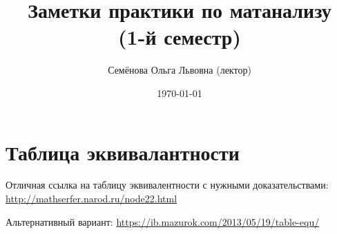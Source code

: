 \documentclass[12pt, a4paper]{article}
\title{Заметки практики по матанализу \\(1-й семестр)}
\author{
  \vova
  \and
  {Семёнова Ольга Львовна (лектор)}
}
\date{\today}
\begin{document}
  \tittoc

  \section{Таблица эквивалантности}
  Отличная ссылка на таблицу эквивалентности с нужными доказательствами: 
  \url{http://mathserfer.narod.ru/node22.html}

  Альтернативный вариант:
  \url{https://ib.mazurok.com/2013/05/19/table-equ/} 
\end{document}
